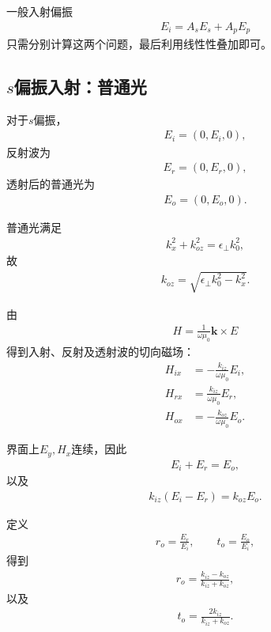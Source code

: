\documentclass{article}
\begin{document}
一般入射偏振
\begin{align}
    E_i=A_sE_s+A_pE_p
\end{align}
只需分别计算这两个问题，最后利用线性性叠加即可。

\subsection{$s$偏振入射：普通光}

对于$s$偏振，
\begin{align}
    E_i
    =
    (0,E_i,0),
\end{align}
反射波为
\begin{align}
    E_r
    =
    (0,E_r,0),
\end{align}
透射后的普通光为
\begin{align}
    E_o
    =
    (0,E_o,0).
\end{align}

普通光满足
\begin{align}
    k_x^2+k_{oz}^2
    =
    \epsilon_\perp k_0^2,
\end{align}
故
\begin{align}
    k_{oz}
    =
    \sqrt{
    \epsilon_\perp k_0^2-k_x^2
    }.
\end{align}

由
\begin{align}
    H
    =
    \frac{1}{\omega\mu_0}
    \mathbf k\times E
\end{align}
得到入射、反射及透射波的切向磁场：
\begin{align}
    H_{ix}
    &=
    -\frac{k_{iz}}{\omega\mu_0}E_i,
\\
    H_{rx}
    &=
    \frac{k_{iz}}{\omega\mu_0}E_r,
\\
    H_{ox}
    &=
    -\frac{k_{oz}}{\omega\mu_0}E_o.
\end{align}

界面上$E_y,H_x$连续，因此
\begin{align}
    E_i+E_r=E_o,
\end{align}
以及
\begin{align}
    k_{iz}(E_i-E_r)
    =
    k_{oz}E_o.
\end{align}

定义
\begin{align}
    r_o=\frac{E_r}{E_i},
    \qquad
    t_o=\frac{E_o}{E_i},
\end{align}
得到
\begin{align}
    \boxed{
    r_o
    =
    \frac{k_{iz}-k_{oz}}
    {k_{iz}+k_{oz}}
    },
\end{align}
以及
\begin{align}
    \boxed{
    t_o
    =
    \frac{2k_{iz}}
    {k_{iz}+k_{oz}}
    }.
\end{align}
\end{document}
